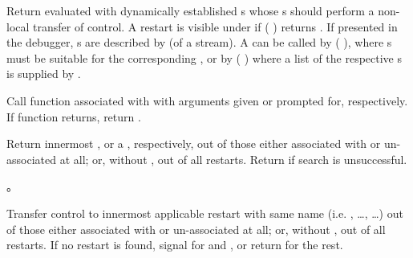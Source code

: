 \begin{LIST}{1cm}
  {
    Return  evaluated with dynamically
    established s whose s should
    perform a non-local transfer of control.  A restart is visible
    under  if ( )
    returns \T.  If presented in the debugger, s are
    described by  (of a stream).  A
     can be called by ( 
    ), where s must be suitable for the
    corresponding , or by
    ( ) where a list of
    the respective s is supplied by .
  }

  {
    Call function associated with  with arguments given
    or prompted for, respectively. If  function returns,
    return .
  }

  {
    Return innermost  , or a , respectively, out of those either associated with
     or un-associated at all; or, without
    , out of all restarts. Return \retval{\NIL} if
    search is unsuccessful.
  }

  {
  。
  }

  {
  Transfer control to innermost applicable restart with same name
  (i.e. , \ldots,  \ldots) out of those either associated
  with  or un-associated at all; or, without
  , out of all restarts. If no restart is found,
  signal  for  and ,
  or return \retval{\NIL} for the rest.
  }


\end{LIST}
